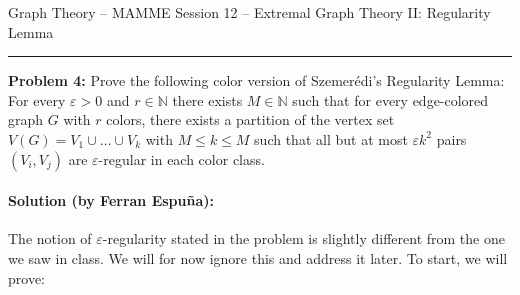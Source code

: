 \documentclass{amsart}
\theoremstyle{plain}
\theoremstyle{definition}
\newcommand{\N}{\mathbb{N}}
\begin{document}
    {\Large Graph Theory -- MAMME}
    {\Large Session 12 -- Extremal Graph Theory II: Regularity Lemma}

    \vspace{0.5cm}

    \hrule

    \vspace{0.5cm}

    \noindent \textbf{Problem 4:}
    Prove the following color version of Szemerédi's Regularity Lemma:
    For every $\varepsilon > 0$ and $r \in \N$ there exists $M \in \N$ such that
    for every edge-colored graph $G$ with $r$ colors, there exists a partition of the vertex set
    $V(G) = V_1 \cup \ldots \cup V_k$ with $M \leq k \leq M$ such that
    all but at most $\varepsilon k^2$ pairs $(V_i, V_j)$ are $\varepsilon$-regular in each color class.


    \paragraph{\textbf{Solution (by Ferran Espuña):}}

    The notion of $\varepsilon$-regularity stated in the problem is slightly different from the one we saw in class.
    We will for now ignore this and address it later.
    To start, we will prove:
\end{document}
